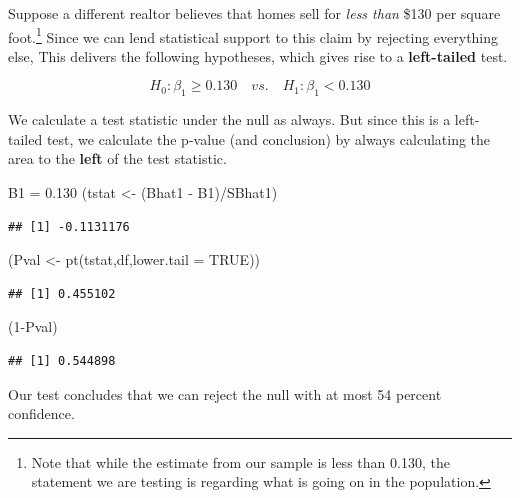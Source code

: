\documentclass[
]{book}
\newenvironment{Shaded}{\begin{snugshade}}{\end{snugshade}}
\newcommand{\AttributeTok}[1]{\textcolor[rgb]{0.77,0.63,0.00}{#1}}
\newcommand{\ConstantTok}[1]{\textcolor[rgb]{0.00,0.00,0.00}{#1}}
\newcommand{\DecValTok}[1]{\textcolor[rgb]{0.00,0.00,0.81}{#1}}
\newcommand{\FloatTok}[1]{\textcolor[rgb]{0.00,0.00,0.81}{#1}}
\newcommand{\FunctionTok}[1]{\textcolor[rgb]{0.00,0.00,0.00}{#1}}
\newcommand{\NormalTok}[1]{#1}
\newcommand{\OtherTok}[1]{\textcolor[rgb]{0.56,0.35,0.01}{#1}}
\newcommand{\SpecialCharTok}[1]{\textcolor[rgb]{0.00,0.00,0.00}{#1}}
\begin{document}
Suppose a different realtor believes that homes sell for \emph{less than} \$130 per square foot.\footnote{Note that while the estimate from our sample is less than 0.130, the statement we are testing is regarding what is going on in the population.} Since we can lend statistical support to this claim by rejecting everything else, This delivers the following hypotheses, which gives rise to a \textbf{left-tailed} test.

\[H_0:\beta_1\geq0.130 \quad vs. \quad H_1:\beta_1<0.130\]

We calculate a test statistic under the null as always. But since this is a left-tailed test, we calculate the p-value (and conclusion) by always calculating the area to the \textbf{left} of the test statistic.

\begin{Shaded}
\begin{Highlighting}[]
\NormalTok{B1 }\OtherTok{=} \FloatTok{0.130}
\NormalTok{(tstat }\OtherTok{\textless{}{-}}\NormalTok{ (Bhat1 }\SpecialCharTok{{-}}\NormalTok{ B1)}\SpecialCharTok{/}\NormalTok{SBhat1)}
\end{Highlighting}
\end{Shaded}

\begin{verbatim}
## [1] -0.1131176
\end{verbatim}

\begin{Shaded}
\begin{Highlighting}[]
\NormalTok{(Pval }\OtherTok{\textless{}{-}} \FunctionTok{pt}\NormalTok{(tstat,df,}\AttributeTok{lower.tail =} \ConstantTok{TRUE}\NormalTok{))}
\end{Highlighting}
\end{Shaded}

\begin{verbatim}
## [1] 0.455102
\end{verbatim}

\begin{Shaded}
\begin{Highlighting}[]
\NormalTok{(}\DecValTok{1}\SpecialCharTok{{-}}\NormalTok{Pval)}
\end{Highlighting}
\end{Shaded}

\begin{verbatim}
## [1] 0.544898
\end{verbatim}

Our test concludes that we can reject the null with at most 54 percent confidence.
\end{document}

